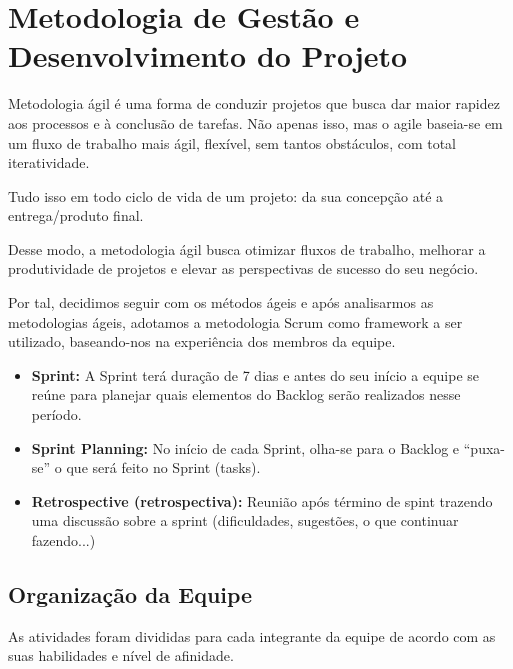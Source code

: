 
\chapter{Metodologia de Gestão e Desenvolvimento do Projeto}
Metodologia ágil é uma forma de conduzir projetos que busca dar maior rapidez aos processos e à conclusão de tarefas. Não apenas isso, mas o agile baseia-se em um fluxo de trabalho mais ágil, flexível, sem tantos obstáculos, com total iteratividade.

Tudo isso em todo ciclo de vida de um projeto: da sua concepção até a entrega/produto final.

Desse modo, a metodologia ágil busca otimizar fluxos de trabalho, melhorar a produtividade de projetos e elevar as perspectivas de sucesso do seu negócio.

Por tal, decidimos seguir com os métodos ágeis e após analisarmos as metodologias ágeis, adotamos a metodologia Scrum como framework a ser utilizado, baseando-nos na experiência dos membros da equipe. 

\begin{itemize}
    \item \textbf{Sprint:} A Sprint terá duração de 7 dias e antes do seu início a equipe se reúne para planejar quais elementos do Backlog serão realizados nesse período.
    \item \textbf{Sprint Planning:} No início de cada Sprint, olha-se para o Backlog e “puxa-se” o que será feito no Sprint (tasks).
    \item \textbf{Retrospective (retrospectiva):} Reunião após término de spint trazendo uma discussão sobre a sprint (dificuldades, sugestões, o que continuar fazendo...) 
\end{itemize}

\section {Organização da Equipe}

As atividades foram divididas para cada integrante da equipe de acordo com as suas habilidades e nível de afinidade.

